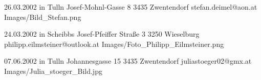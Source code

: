 
\begin{Diplomandenvorstellung}
		  {26.03.2002 in Tulln}
		  {Josef-Mohnl-Gasse 8}
		  {3435 Zwentendorf}
		  {
		  }
		  {stefan.deimel@aon.at}
		  {Images/Bild_Stefan.png}
\newpage	  

		  {24.03.2002 in Scheibbs}
		  {Josef-Pfeiffer Straße 3}
		  {3250 Wieselburg}
		  {
		  }
		  {philipp.eilmsteiner@outlook.at}
		  {Images/Foto_Philipp_Eilmsteiner.png}
\newpage

		  {07.06.2002 in Tulln}
		  {Johannesgasse 15}
		  {3435 Zwentendorf}
		  {
		  }
		  {juliastoeger02@gmx.at}
		  {Images/Julia_stoeger_Bild.jpg}
		  
\end{Diplomandenvorstellung}

